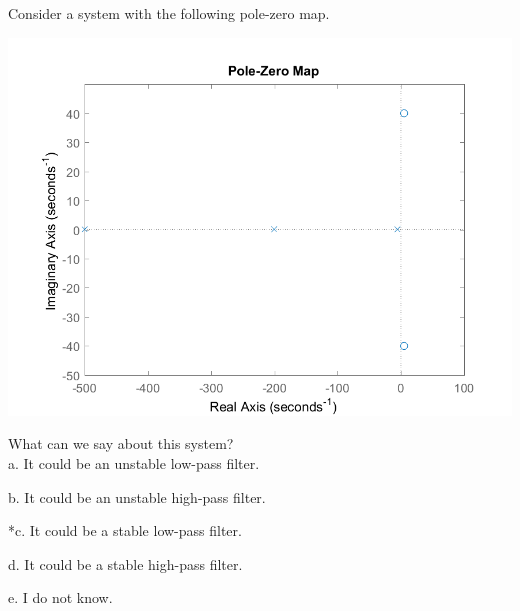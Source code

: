 
Consider a system with the following pole-zero map.

\includegraphics[width=5.25618in,height=3.94064in]{../../Images/PolesAndZeroesQ5.png}

What can we say about this system? \\

a. It could be an unstable low-pass filter.

b. It could be an unstable high-pass filter.

*c. It could be a stable low-pass filter.

d. It could be a stable high-pass filter.

e. I do not know. \\
